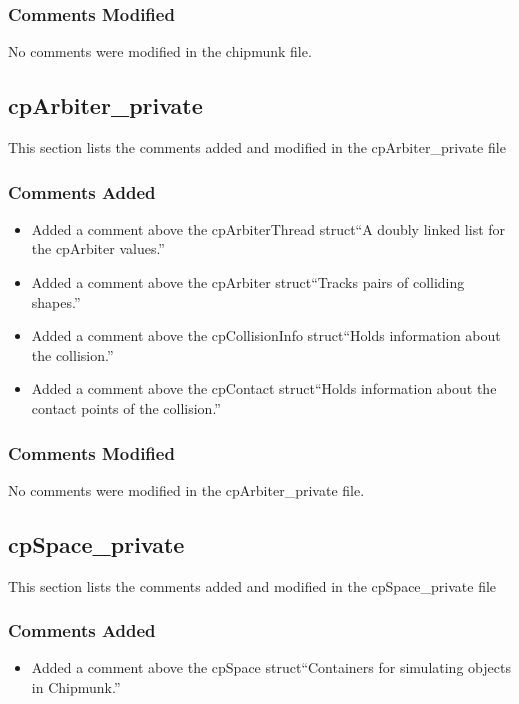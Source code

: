 \documentclass[12pt]{article}
\begin{document}
\subsubsection{Comments Modified}
No comments were modified in the chipmunk file.




\subsection{cpArbiter\_private} 
This section lists the comments added and modified  in the cpArbiter\_private file

\subsubsection{Comments Added}
\begin{itemize}
\item Added a comment above the cpArbiterThread struct``A doubly linked list for the cpArbiter values.''
\item  Added a comment above the cpArbiter struct``Tracks pairs of colliding shapes.''
\item  Added a comment above the cpCollisionInfo  struct``Holds information about the collision.''
\item  Added a comment above the cpContact  struct``Holds information about the contact points of the collision.''
\end{itemize}

\subsubsection{Comments Modified}
No comments were modified in the cpArbiter\_private file.



\subsection{cpSpace\_private} 
This section lists the comments added and modified  in the cpSpace\_private file

\subsubsection{Comments Added}
\begin{itemize}
\item Added a comment above the cpSpace struct``Containers for simulating objects in Chipmunk.''
\end{itemize}
\end{document}
